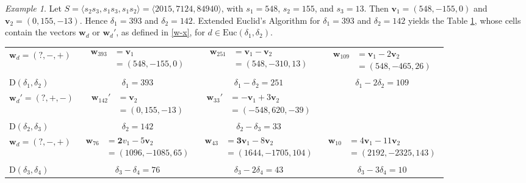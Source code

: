 \documentclass[11pt]{amsart}
\theoremstyle{remark}
\newtheorem{example}[theorem]{Example}
\begin{document}
\begin{example}\label{mainexample}
Let $S=\langle s_2s_3,s_1s_3,s_1s_2\rangle=\langle 2015, 7124, 84940\rangle$, with $s_1=548$, $s_2=155$, and $s_3=13$. Then $\mathbf v_1=(548,-155,0)$ and $\mathbf v_2=(0,155,-13)$. Hence
$\delta_1=393$ and $\delta_2=142$. Extended Euclid's Algorithm for $\delta_1=393$ and $\delta_2=142$ yields the Table \ref{tabla-ejemplo}, whose cells contain the vectors $\mathbf w_d$ or $\mathbf w_d'$, as defined in \eqref{w-x}, for $d\in \mathrm{Euc}(\delta_1,\delta_2)$.

\begin{table}[h]\label{tabla-ejemplo}
{\footnotesize
\begin{tabular}{l|ccc}
 \hline
  $\mathbf w_d = (?,-,+)$ & $\begin{aligned} \mathbf w_{393} & =\mathbf v_1 \\ &=(548, -155, 0) \end{aligned}$ & $\begin{aligned}\mathbf w_{251}& =\mathbf v_1-\mathbf v_2\\ &= (548, -310, 13)\end{aligned}$ & $\begin{aligned} \mathbf w_{109} &=\mathbf v_1-2\mathbf v_2\\&= (548, -465, 26)\end{aligned}$ \\ 
  $\mathrm D(\delta_1,\delta_2)$ & $\delta_1=393$ & $\delta_1-\delta_2=251$ & $\delta_1-2\delta_2=109$  \\
  
  
 \hline
   $\mathbf w_d'=(?,+,-)$ & $\begin{aligned} \mathbf w_{142}' & = \mathbf v_2 \\ & = (0, 155, -13)\end{aligned}$ & $\begin{aligned} \mathbf w_{33}' & = -\mathbf v_1+3\mathbf v_2 \\ &= (-548, 620, -39) \end{aligned}$  & \\ 
  $\mathrm D(\delta_2, \delta_3)$ &$\delta_2=142$ & $\delta_2-\delta_3=33$  & \\ 
  
 \hline
  $\mathbf w_d = (?,-,+)$ & $\begin{aligned} \mathbf w_{76} & =\mathbf 2v_1-5\mathbf v_2 \\ &=(1096, -1085, 65) \end{aligned}$ & $\begin{aligned}\mathbf w_{43}& =\mathbf 3\mathbf v_1-8\mathbf v_2\\ &= (1644, -1705, 104)\end{aligned}$ & $\begin{aligned} \mathbf w_{10} &=4\mathbf v_1-11\mathbf v_2\\&= (2192, -2325, 143)\end{aligned}$\\ 
  $\mathrm D(\delta_3,\delta_4)$ & $\delta_3-\delta_4=76$ & $\delta_3-2\delta_4=43$ & $\delta_3-3\delta_4=10$  \\


\end{tabular}}
\end{table}
\end{example}
\end{document}
